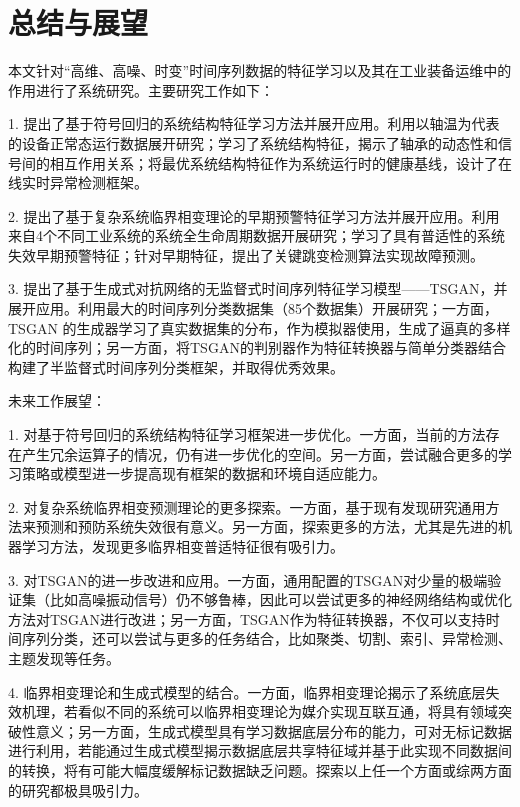 
\chapter{总结与展望}
\label{chap:conclusion}

本文针对“高维、高噪、时变”时间序列数据的特征学习以及其在工业装备运维中的作用进行了系统研究。主要研究工作如下：

1. 提出了基于符号回归的系统结构特征学习方法并展开应用。利用以轴温为代表的设备正常态运行数据展开研究；学习了系统结构特征，揭示了轴承的动态性和信号间的相互作用关系；将最优系统结构特征作为系统运行时的健康基线，设计了在线实时异常检测框架。

2. 提出了基于复杂系统临界相变理论的早期预警特征学习方法并展开应用。利用来自4个不同工业系统的系统全生命周期数据开展研究；学习了具有普适性的系统失效早期预警特征；针对早期特征，提出了关键跳变检测算法实现故障预测。

3. 提出了基于生成式对抗网络的无监督式时间序列特征学习模型——TSGAN，并展开应用。利用最大的时间序列分类数据集（85个数据集）开展研究；一方面，TSGAN 的生成器学习了真实数据集的分布，作为模拟器使用，生成了逼真的多样化的时间序列；另一方面，将TSGAN的判别器作为特征转换器与简单分类器结合构建了半监督式时间序列分类框架，并取得优秀效果。

未来工作展望：

1. 对基于符号回归的系统结构特征学习框架进一步优化。一方面，当前的方法存在产生冗余运算子的情况，仍有进一步优化的空间。另一方面，尝试融合更多的学习策略或模型进一步提高现有框架的数据和环境自适应能力。

2. 对复杂系统临界相变预测理论的更多探索。一方面，基于现有发现研究通用方法来预测和预防系统失效很有意义。另一方面，探索更多的方法，尤其是先进的机器学习方法，发现更多临界相变普适特征很有吸引力。

3. 对TSGAN的进一步改进和应用。一方面，通用配置的TSGAN对少量的极端验证集（比如高噪振动信号）仍不够鲁棒，因此可以尝试更多的神经网络结构或优化方法对TSGAN进行改进；另一方面，TSGAN作为特征转换器，不仅可以支持时间序列分类，还可以尝试与更多的任务结合，比如聚类、切割、索引、异常检测、主题发现等任务。

4. 临界相变理论和生成式模型的结合。一方面，临界相变理论揭示了系统底层失效机理，若看似不同的系统可以临界相变理论为媒介实现互联互通，将具有领域突破性意义；另一方面，生成式模型具有学习数据底层分布的能力，可对无标记数据进行利用，若能通过生成式模型揭示数据底层共享特征域并基于此实现不同数据间的转换，将有可能大幅度缓解标记数据缺乏问题。探索以上任一个方面或综两方面的研究都极具吸引力。

